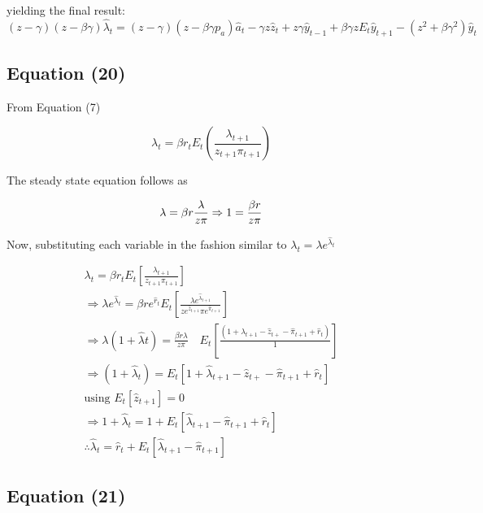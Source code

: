 \documentclass[11pt,preprint, authoryear]{elsarticle}
\numberwithin{equation}{section}
\numberwithin{figure}{section}
\numberwithin{table}{section}
\begin{document}
yielding the final result:
\[(z-\gamma)(z-\beta \gamma) \hat{\lambda}_{t}=(z-\gamma)\left(z-\beta \gamma p_{a}\right) \hat{a}_{t}-\gamma z \hat{z}_{t}+z \gamma \hat{y}_{t-1}+\beta \gamma z E_{t} \hat{y}_{t+1}-\left(z^{2}+\beta \gamma^{2}\right) \hat{y}_{t}\]

\hypertarget{equation-20}{%
\subsection{Equation (20)}\label{equation-20}}

From Equation (7)

\[\lambda_{t}=\beta r_{t} E_{t}\left(\frac{\lambda_{t+1}}{z_{t+1} \pi_{t+1}}\right)\]

The steady state equation follows as

\[\lambda = \beta r \frac{\lambda} {z \pi} \\
\Rightarrow 1=\frac{\beta r} {z \pi}\]

Now, substituting each variable in the fashion similar to
\(\lambda_t = \lambda e^{\hat{\lambda}_t}\)

\[\begin{array}{l}
\lambda_{t}=\beta r_{t} E_{t}\left[\frac{\lambda_{t+1}}{z_{t+1} \pi_{t+1}}\right]\\
\Rightarrow \lambda e^{\hat{\lambda}_t}=\beta r e^{\hat{r}_{t}} E_{t}\left[\frac{\lambda e^{\hat{\lambda}_{t+1}}}{z e^{\hat{z}_{t+1}} \pi e^{\hat{\pi}_{t+1}}} \right]\\
\Rightarrow \lambda\left(1+\hat{\lambda}{t}\right)=\frac{\beta r \lambda}{z \pi} \quad E_{t}\left[\frac{\left(1+\hat{\lambda}_{t+1}-\hat{z}_{t+}-\hat{\pi}_{t+1}+\hat{r}_{t}\right)}{1}\right]\\
\Rightarrow \left(1+\hat{\lambda}_{t}\right)= E_{t}\left[1+\hat{\lambda}_{t+1}-\hat{z}_{t+}-\hat{\pi}_{t+1}+\hat{r}_{t}\right]\\
\text{using }{ E_t }[\hat{z}_{t+1}]=0\\
\Rightarrow 1+\hat{\lambda}_{t} = 1+E_{t}\left[\hat{\lambda}_{t+1}-\hat{\pi}_{t+1}+\hat{r}_{t}\right]\\
\therefore \hat{\lambda}_{t}=\hat{r}_{t}+E_{t}\left[\hat{\lambda}_{t+1} - \hat{\pi}_{t+1}\right]
\end{array}\]

\hypertarget{equation-21}{%
\subsection{Equation (21)}\label{equation-21}}
\end{document}
